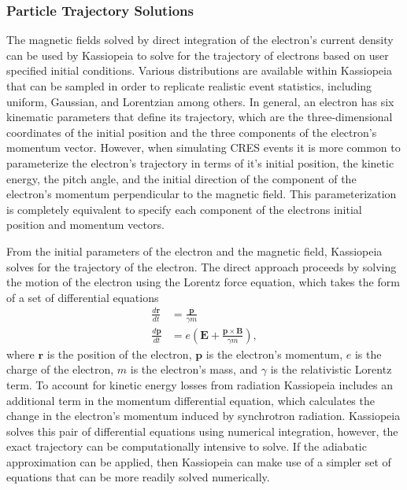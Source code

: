 \subsubsection*{Particle Trajectory Solutions}

The magnetic fields solved by direct integration of the electron's current density can be used by Kassiopeia to solve for the trajectory of electrons based on user specified initial conditions. Various distributions are available within Kassiopeia that can be sampled in order to replicate realistic event statistics, including uniform, Gaussian, and Lorentzian among others. In general, an electron has six kinematic parameters that define its trajectory, which are the three-dimensional coordinates of the initial position and the three components of the electron's momentum vector. However, when simulating CRES events it is more common to parameterize the electron's trajectory in terms of it's initial position, the kinetic energy, the pitch angle, and the initial direction of the component of the electron's momentum perpendicular to the magnetic field. This parameterization is completely equivalent to specify each component of the electrons initial position and momentum vectors. 

From the initial parameters of the electron and the magnetic field, Kassiopeia solves for the trajectory of the electron. The direct approach proceeds by solving the motion of the electron using the Lorentz force equation, which takes the form of a set of differential equations 
\begin{align}
    \frac{d\mathbf{r}}{dt}&=\frac{\mathbf{p}}{\gamma m}\\
    \frac{d\mathbf{p}}{dt}&=e(\mathbf{E}+\frac{\mathbf{p}\times\mathbf{B}}{\gamma m}),
\end{align}
where $\mathbf{r}$ is the position of the electron, $\mathbf{p}$ is the electron's momentum, $e$ is the charge of the electron, $m$ is the electron's mass, and $\gamma$ is the relativistic Lorentz term. To account for kinetic energy losses from radiation Kassiopeia includes an additional term in the momentum differential equation, which calculates the change in the electron's momentum induced by synchrotron radiation. Kassiopeia solves this pair of differential equations using numerical integration, however, the exact trajectory can be computationally intensive to solve. If the adiabatic approximation can be applied, then Kassiopeia can make use of a simpler set of equations that can be more readily solved numerically. 


